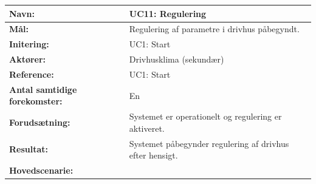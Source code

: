 \clearpage

\begin{table}[h]
\begin{tabularx}{\textwidth}{| >{\raggedright\arraybackslash}p{3.3 cm} | >{\raggedright\arraybackslash}X |} \hline

\textbf{Navn:} 						& UC11: Regulering\\ \hline
\textbf{Mål:}						& Regulering af parametre i drivhus påbegyndt. \\ \hline
\textbf{Initering:}					& UC1: Start \\ \hline
\textbf{Aktører:} 					& Drivhusklima (sekundær) \\ \hline
\textbf{Reference:} 					& UC1: Start \\ \hline
\textbf{Antal samtidige forekomster:} & En \\ \hline
\textbf{Forudsætning:} 				& Systemet er operationelt og regulering er aktiveret. \\ \hline
\textbf{Resultat:}					& Systemet påbegynder regulering af drivhus efter hensigt. \\ \hline
\textbf{Hovedscenarie:}				& 


\end{tabularx}
\end{table}
